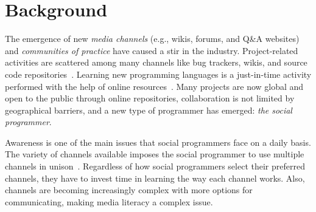 \documentclass{sig-alternate-05-2015}
\begin{document}



\section{Background}
\label{cha:background}

	The emergence of new \textit{media channels} (e.g., wikis, forums, and Q\&A websites) and \textit{communities of practice} have caused a stir in the industry.
	Project-related activities are scattered among many channels like bug trackers, wikis, and source code repositories~\cite{Guzzi2013}.
	Learning new programming languages is a just-in-time activity performed with the help of online resources~\cite{Sim2013,Storey2010,Hartmann2008}.
	Many projects are now global and open to the public through online repositories, collaboration is not limited by geographical barriers, and a new type of programmer has emerged: \textit{the social programmer}.

	Awareness is one of the main issues that social programmers face on a daily basis.
	The variety of channels available imposes the social programmer to use multiple channels in unison~\cite{Storey2010, Storey2014}.
	Regardless of how social programmers select their preferred channels, they have to invest time in learning the way each channel works.
	Also, channels are becoming increasingly complex with more options for communicating, making media literacy a complex issue.
\end{document}
